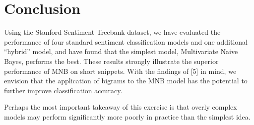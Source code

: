\documentclass[11pt]{article}
\begin{document}
\section{Conclusion}
Using the Stanford Sentiment Treebank dataset, we have evaluated the performance of four standard sentiment classification models and one additional ``hybrid'' model, and have found that the simplest model, Multivariate Naive Bayes, performs the best. These results strongly illustrate the superior performance of MNB on short snippets. With the findings of [5] in mind, we envision that the application of bigrams to the MNB model has the potential to further improve classification accuracy.

Perhaps the most important takeaway of this exercise is that overly complex models may perform significantly more poorly in practice than the simplest idea.  



\nocite{*}

\end{document}
